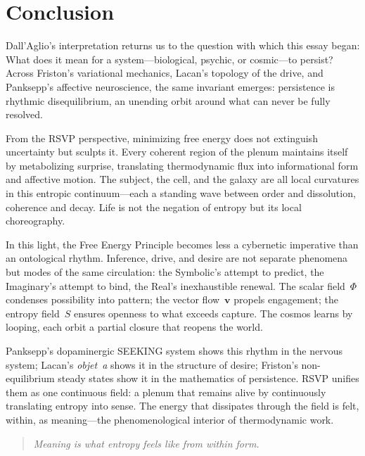 \documentclass[12pt,a4paper]{article}
\begin{document}
\section{Conclusion}
\label{sec:conclusion}

Dall’Aglio’s interpretation returns us to the question with which this essay began:  
What does it mean for a system---biological, psychic, or cosmic---to persist?  
Across Friston’s variational mechanics, Lacan’s topology of the drive, and Panksepp’s affective neuroscience, the same invariant emerges:  
persistence is rhythmic disequilibrium, an unending orbit around what can never be fully resolved.

From the RSVP perspective, minimizing free energy does not extinguish uncertainty but sculpts it.  
Every coherent region of the plenum maintains itself by metabolizing surprise, translating thermodynamic flux into informational form and affective motion.  
The subject, the cell, and the galaxy are all local curvatures in this entropic continuum---each a standing wave between order and dissolution, coherence and decay.  
Life is not the negation of entropy but its local choreography.

In this light, the Free Energy Principle becomes less a cybernetic imperative than an ontological rhythm.  
Inference, drive, and desire are not separate phenomena but modes of the same circulation:  
the Symbolic’s attempt to predict, the Imaginary’s attempt to bind, the Real’s inexhaustible renewal.  
The scalar field~$\Phi$ condenses possibility into pattern; the vector flow~$\mathbf{v}$ propels engagement; the entropy field~$S$ ensures openness to what exceeds capture.  
The cosmos learns by looping, each orbit a partial closure that reopens the world.

Panksepp’s dopaminergic \textsc{SEEKING} system shows this rhythm in the nervous system;  
Lacan’s \emph{objet~a} shows it in the structure of desire;  
Friston’s non-equilibrium steady states show it in the mathematics of persistence.  
RSVP unifies them as one continuous field:  
a plenum that remains alive by continuously translating entropy into sense.  
The energy that dissipates through the field is felt, within, as meaning---the phenomenological interior of thermodynamic work.

\begin{quote}
\textit{Meaning is what entropy feels like from within form.}
\end{quote}
\end{document}
